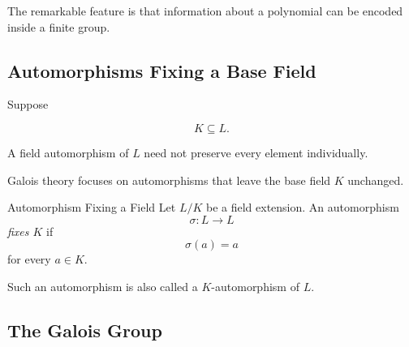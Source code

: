 \begin{center}
\end{center}

The remarkable feature is that information about a polynomial can be encoded
inside a finite group.

\subsection{Automorphisms Fixing a Base Field}
\label{subsec:automorphisms-fixing-field}

Suppose

\[ K\subseteq L. \]

A field automorphism of \(L\) need not preserve every element individually.

Galois theory focuses on automorphisms that leave the base field \(K\)
unchanged.

\begin{definitionbox}{Automorphism Fixing a Field}
Let \(L/K\) be a field extension. An automorphism
\[ \sigma:L\to L \]
\emph{fixes \(K\)} if
\[ \sigma(a)=a \]
for every \(a\in K\).
\end{definitionbox}

Such an automorphism is also called a \(K\)-automorphism of \(L\).

\subsection{The Galois Group}
\label{subsec:galois-group}

